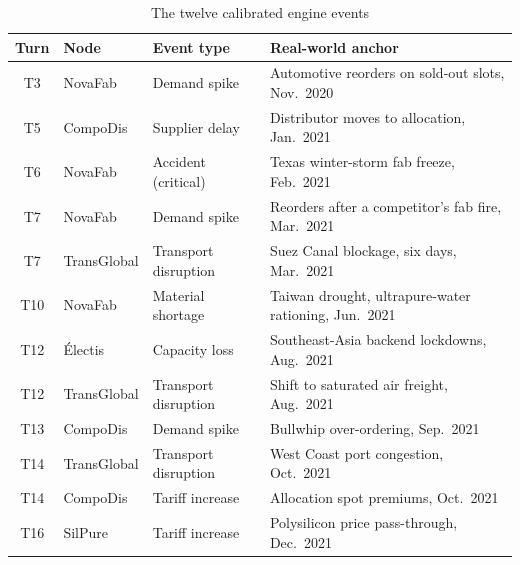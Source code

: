 \begin{table}[htbp]
\centering
\caption{The twelve calibrated engine events}
\label{tab:helios_events}
\small
\begin{tabularx}{\linewidth}{c >{\raggedright\arraybackslash}p{2.3cm} >{\raggedright\arraybackslash}p{2.9cm} X}
\toprule
\textbf{Turn} & \textbf{Node} & \textbf{Event type} & \textbf{Real-world anchor} \\
\midrule
T3 & NovaFab & Demand spike & Automotive reorders on sold-out slots, Nov.\ 2020 \\
T5 & CompoDis & Supplier delay & Distributor moves to allocation, Jan.\ 2021 \\
T6 & NovaFab & Accident (critical) & Texas winter-storm fab freeze, Feb.\ 2021 \\
T7 & NovaFab & Demand spike & Reorders after a competitor's fab fire, Mar.\ 2021 \\
T7 & TransGlobal & Transport disruption & Suez Canal blockage, six days, Mar.\ 2021 \\
T10 & NovaFab & Material shortage & Taiwan drought, ultrapure-water rationing, Jun.\ 2021 \\
T12 & \'Electis & Capacity loss & Southeast-Asia backend lockdowns, Aug.\ 2021 \\
T12 & TransGlobal & Transport disruption & Shift to saturated air freight, Aug.\ 2021 \\
T13 & CompoDis & Demand spike & Bullwhip over-ordering, Sep.\ 2021 \\
T14 & TransGlobal & Transport disruption & West Coast port congestion, Oct.\ 2021 \\
T14 & CompoDis & Tariff increase & Allocation spot premiums, Oct.\ 2021 \\
T16 & SilPure & Tariff increase & Polysilicon price pass-through, Dec.\ 2021 \\
\bottomrule
\end{tabularx}
\end{table}

